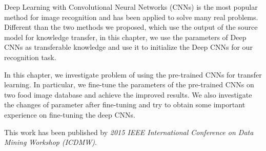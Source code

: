 Deep Learning with Convolutional Neural Networks (CNNs) is the most popular method for image recognition and has been applied to solve many real problems. Different than the two methods we proposed, which use the output of the source model for knowledge transfer, in this chapter, we use the parameters of Deep CNNs as transferable knowledge and use it to initialize the Deep CNNs for our recognition task.

In this chapter, we investigate problem of using the pre-trained CNNs for transfer learning. In particular, we fine-tune the parameters of the pre-trained CNNs on two food image database and achieve the improved results. We also investigate the changes of parameter after fine-tuning and try to obtain some important experience on fine-tuning the deep CNNs.

This work has been published by \textit{2015 IEEE International Conference on Data Mining Workshop (ICDMW)}.

 

